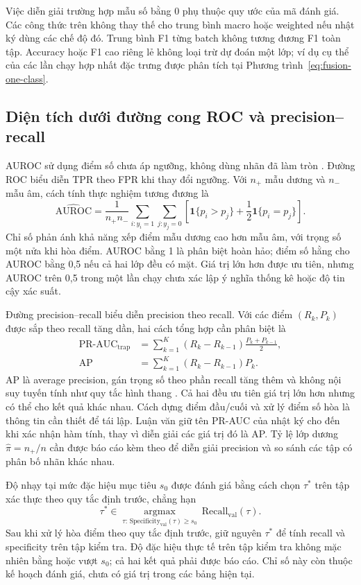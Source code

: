 Việc diễn giải trường hợp mẫu số bằng 0 phụ thuộc quy ước của mã đánh
giá. Các công thức trên không thay thế cho trung bình macro hoặc weighted
nếu nhật ký dùng các chế độ đó. Trung bình F1 từng batch không tương đương F1
toàn tập. Accuracy hoặc F1 cao riêng lẻ không loại trừ dự đoán một lớp;
ví dụ cụ thể của các lần chạy hợp nhất đặc trưng được phân tích tại
Phương trình~\eqref{eq:fusion-one-class}.

\subsection{Diện tích dưới đường cong ROC và precision--recall}
AUROC sử dụng điểm số chưa áp ngưỡng, không dùng nhãn đã làm tròn
\cite{sklearnROC}. Đường ROC biểu diễn TPR theo FPR khi thay đổi ngưỡng.
Với $n_+$ mẫu dương và $n_-$ mẫu âm, cách tính thực nghiệm tương đương là
\begin{equation}
 \widehat{\mathrm{AUROC}}=\frac{1}{n_+n_-}
 \sum_{i:y_i=1}\sum_{j:y_j=0}
 \left[\mathbf 1\{p_i>p_j\}+\frac12\mathbf 1\{p_i=p_j\}\right].
 \label{eq:metric-auroc}
\end{equation}
Chỉ số phản ánh khả năng xếp điểm mẫu dương cao hơn mẫu âm, với trọng số một nửa khi hòa điểm.
AUROC bằng 1 là phân biệt hoàn hảo; điểm số hằng cho AUROC bằng 0,5 nếu
cả hai lớp đều có mặt. Giá trị lớn hơn được ưu tiên, nhưng AUROC trên 0,5
trong một lần chạy chưa xác lập ý nghĩa thống kê hoặc độ tin cậy xác suất.

Đường precision--recall biểu diễn precision theo recall. Với các điểm
$(R_k,P_k)$ được sắp theo recall tăng dần, hai cách tổng hợp cần phân biệt là
\begin{align}
 \mathrm{PR\!\text{-}\!AUC}_{\mathrm{trap}}
   &=\sum_{k=1}^{K}(R_k-R_{k-1})\frac{P_k+P_{k-1}}{2},\\
 \mathrm{AP}&=\sum_{k=1}^{K}(R_k-R_{k-1})P_k.
 \label{eq:metric-pr-ap}
\end{align}
AP là average precision, gán trọng số theo phần recall tăng thêm và không
nội suy tuyến tính như quy tắc hình thang \cite{sklearnAP}.
Cả hai đều ưu tiên giá trị lớn hơn nhưng có thể cho kết quả khác nhau.
Cách dựng điểm đầu/cuối và xử lý điểm số hòa là thông tin cần thiết để tái lập.
Luận văn giữ tên PR-AUC của nhật ký
cho đến khi xác nhận hàm tính, thay vì diễn giải các giá trị đó là AP.
Tỷ lệ lớp dương $\widehat\pi=n_+/n$ cần được báo cáo kèm theo để diễn giải
precision và so sánh các tập có phân bố nhãn khác nhau.

Độ nhạy tại mức đặc hiệu mục tiêu $s_0$ được đánh giá bằng cách chọn
$\tau^*$ trên tập xác thực theo quy tắc định trước, chẳng hạn
\begin{equation}
 \tau^*\in\underset{\tau:\,\mathrm{Specificity}_{\mathrm{val}}(\tau)\geq s_0}
 {\operatorname{argmax}}\ \mathrm{Recall}_{\mathrm{val}}(\tau).
 \label{eq:metric-target-specificity}
\end{equation}
Sau khi xử lý hòa điểm theo quy tắc định trước, giữ nguyên $\tau^*$ để tính
recall và specificity trên tập kiểm tra. Độ đặc hiệu thực tế trên tập kiểm tra không mặc nhiên
bằng hoặc vượt $s_0$; cả hai kết quả phải được báo cáo. Chỉ số này còn
thuộc kế hoạch đánh giá, chưa có giá trị trong các bảng hiện tại.

